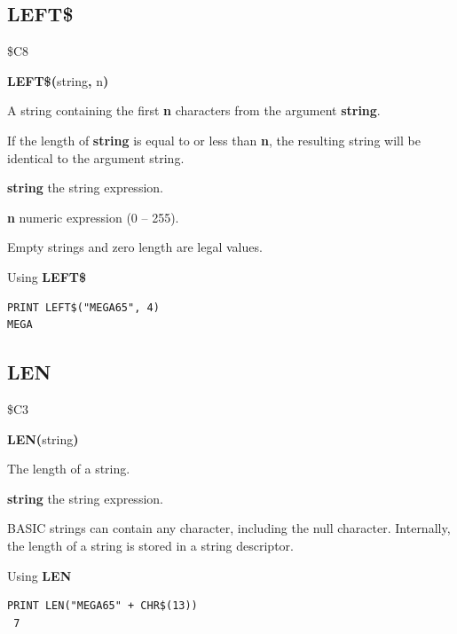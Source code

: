\subsection{LEFT\$}
\begin{description}[leftmargin=2cm,style=nextline]
\item [Token:]    \$C8

\item [Format:]   {\bf LEFT\$(}string{\bf,} n{\bf)}

\item [Returns:]  A string containing the first {\bf n} characters from the argument {\bf string}.

                  If the length of {\bf string} is equal to or less than {\bf n}, the resulting string will be identical to the argument string.

                  {\bf string} the string expression.

                  {\bf n} numeric expression (0 -- 255).

\item [Remarks:]  Empty strings and zero length are legal values.

\item [Example:]  Using {\bf LEFT\$}

\begin{tcolorbox}[colback=black,coltext=white]
\verbatimfont{\codefont}
\begin{verbatim}
PRINT LEFT$("MEGA65", 4)
MEGA
\end{verbatim}
\end{tcolorbox}
\end{description}


\newpage
\subsection{LEN}
\begin{description}[leftmargin=2cm,style=nextline]
\item [Token:]    \$C3

\item [Format:]   {\bf LEN(}string{\bf)}

\item [Returns:]  The length of a string.

                  {\bf string} the string expression.

\item [Remarks:]  BASIC strings can contain any character, including the null character. Internally, the length of a string is stored in a string descriptor.

\item [Example:]  Using {\bf LEN}

\begin{tcolorbox}[colback=black,coltext=white]
\verbatimfont{\codefont}
\begin{verbatim}
PRINT LEN("MEGA65" + CHR$(13))
 7
\end{verbatim}
\end{tcolorbox}
\end{description}

